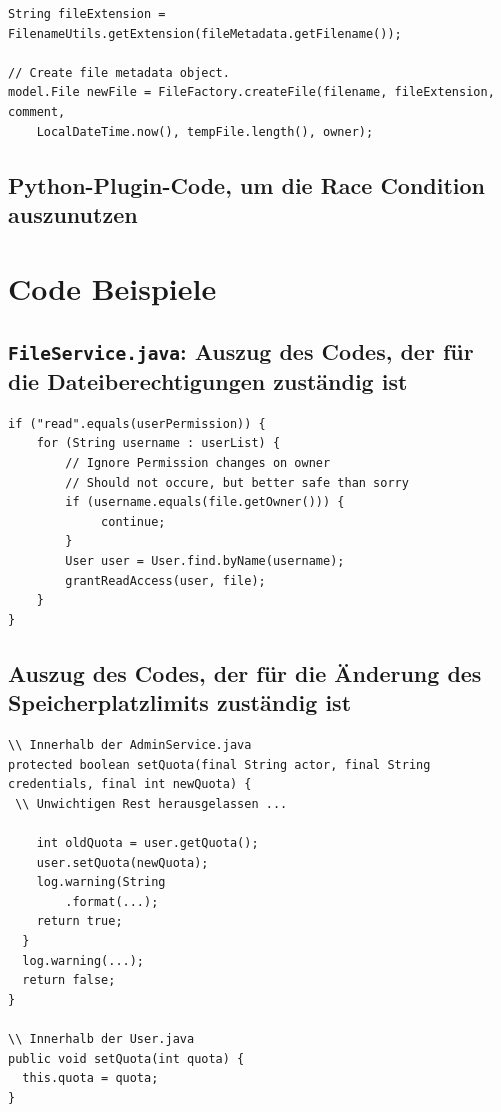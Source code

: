 \documentclass[12pt,DIV14,BCOR10mm,a4paper,parskip=half-,headsepline,headinclude,english,ngerman,bibliography=totocnumbered]{scrreprt}
\begin{document}
\begin{appendices}
\begin{lstlisting}
String fileExtension = FilenameUtils.getExtension(fileMetadata.getFilename());

// Create file metadata object.
model.File newFile = FileFactory.createFile(filename, fileExtension, comment,
    LocalDateTime.now(), tempFile.length(), owner);
\end{lstlisting}

\section{Python-Plugin-Code, um die Race Condition auszunutzen}
\label{fileraceplugin}




\chapter{Code Beispiele}

\section{\texttt{FileService.java}: Auszug des Codes, der für die Dateiberechtigungen zuständig ist}
\label{filepermissions}
\begin{lstlisting}
if ("read".equals(userPermission)) {
	for (String username : userList) {
		// Ignore Permission changes on owner
		// Should not occure, but better safe than sorry
		if (username.equals(file.getOwner())) {
		     continue;
		}
		User user = User.find.byName(username);
		grantReadAccess(user, file);
	}
}
\end{lstlisting}

\section{Auszug des Codes, der für die Änderung des Speicherplatzlimits zuständig ist}
\label{quota-change-fail}
\begin{lstlisting}
\\ Innerhalb der AdminService.java
protected boolean setQuota(final String actor, final String credentials, final int newQuota) {
 \\ Unwichtigen Rest herausgelassen ...

    int oldQuota = user.getQuota();
    user.setQuota(newQuota);
    log.warning(String
        .format(...);
    return true;
  }
  log.warning(...);
  return false;
}

\\ Innerhalb der User.java
public void setQuota(int quota) {
  this.quota = quota;
}


\end{lstlisting}
\end{appendices}
\end{document}
